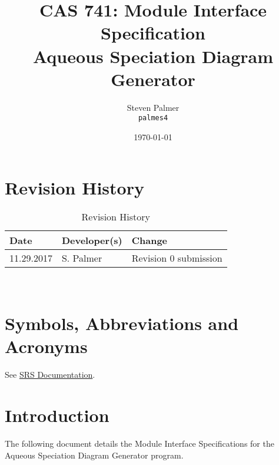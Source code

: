\documentclass[12pt, titlepage]{article}
\begin{document}

\title{CAS 741: Module Interface Specification\\[10pt]\Large Aqueous Speciation Diagram Generator}
\author{Steven Palmer\\\texttt{palmes4}}
\date{\today}
	
\maketitle


\setcounter{secnumdepth}{0}

\section{Revision History}

\begin{table}[hp]
\caption{Revision History} \label{TblRevisionHistory}
\begin{tabularx}{\textwidth}{llX}
\toprule
\textbf{Date} & \textbf{Developer(s)} & \textbf{Change}\\
\midrule
11.29.2017 & S. Palmer & Revision 0 submission\\
\bottomrule
\end{tabularx}
\end{table}

~\newpage

\section{Symbols, Abbreviations and Acronyms}

See \href{https://github.com/palmerst/cas741_sp/blob/master/Doc/SRS/SRS.pdf}{SRS Documentation}.

\newpage

\tableofcontents


\newpage



\setcounter{secnumdepth}{3}

\section{Introduction}

The following document details the Module Interface Specifications for
the Aqueous Speciation Diagram Generator program. 
\end{document}
